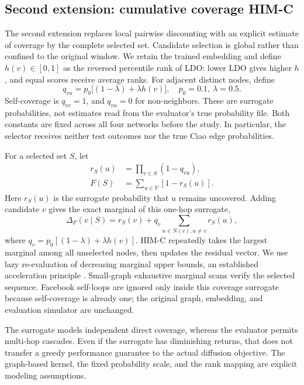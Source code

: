 \subsection{Second extension: cumulative coverage HIM-C}
The second extension replaces local pairwise discounting with an explicit estimate of coverage by the complete selected set. Candidate selection is global rather than confined to the original window. We retain the trained embedding and define $h(v)\in[0,1]$ as the reversed percentile rank of LDO: lower LDO gives higher $h$, and equal scores receive average ranks. For adjacent distinct nodes, define
\begin{equation}
q_{vu}=p_0\big[(1-\lambda)+\lambda h(v)\big],
\quad p_0=0.1,\ \lambda=0.5.
\end{equation}
Self-coverage is $q_{vv}=1$, and $q_{vu}=0$ for non-neighbors. These are surrogate probabilities, not estimates read from the evaluator's true probability file. Both constants are fixed across all four networks before the study. In particular, the selector receives neither test outcomes nor the true Ciao edge probabilities.

For a selected set $S$, let
\begin{align}
r_S(u)&=\prod_{v\in S}(1-q_{vu}),\\
F(S)&=\sum_{u\in V}[1-r_S(u)].
\end{align}
Here $r_S(u)$ is the surrogate probability that $u$ remains uncovered. Adding candidate $v$ gives the exact marginal of this one-hop surrogate,
\begin{equation}
\Delta_F(v\mid S)=r_S(v)+q_v\sum_{u\in N(v),u\ne v}r_S(u),
\end{equation}
where $q_v=p_0[(1-\lambda)+\lambda h(v)]$. HIM-C repeatedly takes the largest marginal among all unselected nodes, then updates the residual vector. We use lazy re-evaluation of decreasing marginal upper bounds, an established acceleration principle \cite{celf}. Small-graph exhaustive marginal scans verify the selected sequence. Facebook self-loops are ignored only inside this coverage surrogate because self-coverage is already one; the original graph, embedding, and evaluation simulator are unchanged.

The surrogate models independent direct coverage, whereas the evaluator permits multi-hop cascades. Even if the surrogate has diminishing returns, that does not transfer a greedy performance guarantee to the actual diffusion objective. The graph-based kernel, the fixed probability scale, and the rank mapping are explicit modeling assumptions.

